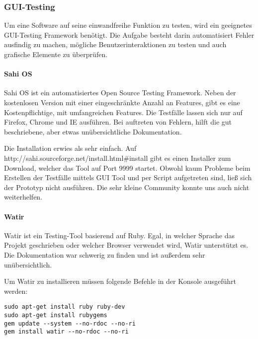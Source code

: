 
\newpage

\subsubsection{GUI-Testing}
Um eine Software auf seine einwandfreihe Funktion zu testen, wird ein geeignetes GUI-Testing Framework benötigt. Die Aufgabe besteht darin automatisiert Fehler ausfindig zu machen, mögliche Benutzerinteraktionen zu testen und auch grafische Elemente zu überprüfen. 

\paragraph{Sahi OS}
Sahi OS ist ein automatisiertes Open Source Testing Framework. Neben der kostenlosen Version mit einer eingeschränkte Anzahl an Features, gibt es eine Kostenpflichtige, mit umfangreichen Features. Die Testfälle lassen sich nur auf Firefox, Chrome und IE ausführen. Bei auftreten von Fehlern, hilft die gut beschriebene, aber etwas unübersichtliche Dokumentation.

Die Installation erwies als sehr einfach. Auf http://sahi.sourceforge.net/install.html\#install gibt es einen Installer zum Download, welcher das Tool auf Port 9999 startet. Obwohl kaum Probleme beim Erstellen der Testfälle mittels GUI Tool und per Script aufgetreten sind, ließ sich der Prototyp nicht ausführen. Die sehr kleine Community konnte uns auch nicht weiterhelfen.

\paragraph{Watir}
Watir ist ein Testing-Tool basierend auf Ruby. Egal, in welcher Sprache das Projekt geschrieben oder welcher Browser verwendet wird, Watir unterstützt es.\\
Die Dokumentation war schwerig zu finden und ist außerdem sehr unübersichtlich. \cite{WATIR}

Um Watir zu installieren müssen folgende Befehle in der Konsole ausgeführt werden: 
\begin{lstlisting}[caption={Installation von Watir \cite{WATIRINSTALL}}]
sudo apt-get install ruby ruby-dev
sudo apt-get install rubygems
gem update --system --no-rdoc --no-ri
gem install watir --no-rdoc --no-ri
\end{lstlisting}


